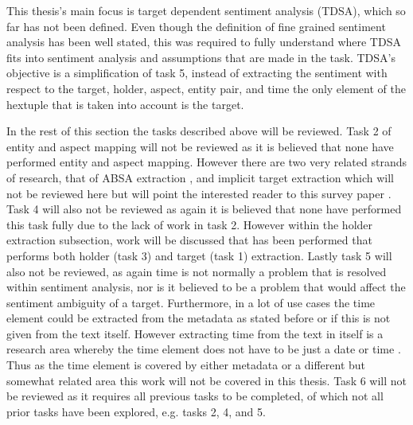 This thesis's main focus is target dependent sentiment analysis (TDSA), which so far has not been defined. Even though the definition of fine grained sentiment analysis has been well stated, this was required to fully understand where TDSA fits into sentiment analysis and assumptions that are made in the task. TDSA's objective is a simplification of task 5, instead of extracting the sentiment with respect to the target, holder, aspect, entity pair, and time the only element of the hextuple that is taken into account is the target.

In the rest of this section the tasks described above will be reviewed. Task 2 of entity and aspect mapping will not be reviewed as it is believed that none have performed entity and aspect mapping. However there are two very related strands of research, that of ABSA extraction \citep{pontiki-etal-2016-semeval}, and implicit target extraction which will not be reviewed here but will point the interested reader to this survey paper \citep{ganganwar2019implicit}. Task 4 will also not be reviewed as again it is believed that none have performed this task fully due to the lack of work in task 2. However within the holder extraction subsection, work will be discussed that has been performed that performs both holder (task 3) and target (task 1) extraction. Lastly task 5 will also not be reviewed, as again time is not normally a problem that is resolved within sentiment analysis, nor is it believed to be a problem that would affect the sentiment ambiguity of a target. Furthermore, in a lot of use cases the time element could be extracted from the metadata as stated before or if this is not given from the text itself. However extracting time from the text in itself is a research area whereby the time element does not have to be just a date or time \citep{bethard-etal-2016-semeval, viani-etal-2018-time}. Thus as the time element is covered by either metadata or a different but somewhat related area this work will not be covered in this thesis. Task 6 will not be reviewed as it requires all previous tasks to be completed, of which not all prior tasks have been explored, e.g. tasks 2, 4, and 5.

